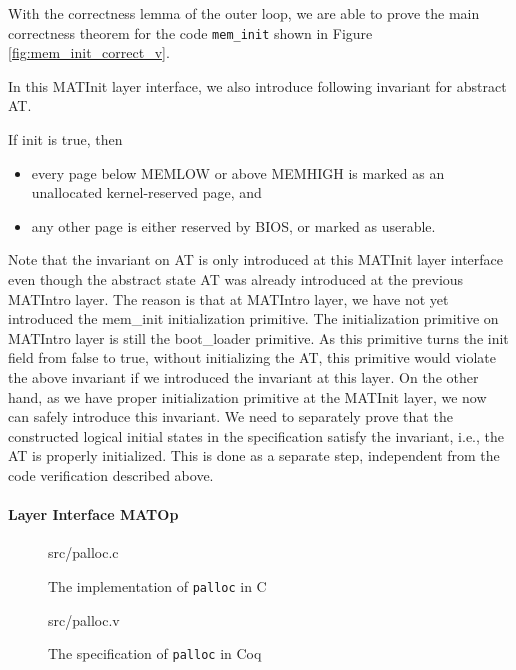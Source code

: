 With the correctness lemma of the outer loop, we are able to prove the main correctness theorem for
the code \texttt{mem\_init} shown in Figure \ref{fig:mem_init_correct_v}.

In this MATInit layer interface, we also introduce following invariant for abstract \textsf{AT}.

\begin{invariant}[valid AT] If \textsf{init} is \textsf{true}, then
\begin{itemize}
\item every page below \textsf{MEMLOW} or above \textsf{MEMHIGH} is marked as an unallocated kernel-reserved page, and
\item any other page is either reserved by BIOS, or marked as userable.
\end{itemize}
\end{invariant}

Note that the invariant on \textsf{AT} is only introduced at this MATInit layer interface even though the abstract
state \textsf{AT} was already introduced at the previous MATIntro layer. The reason is that at MATIntro layer, 
we have not yet introduced the \textsf{mem\_init} initialization primitive. The initialization primitive on MATIntro layer
is still the \textsf{boot\_loader} primitive. As this primitive turns the \textsf{init} field from \textsf{false} to \textsf{true},
without initializing the \textsf{AT}, this primitive would violate the above invariant if we introduced the invariant at this layer.
On the other hand, as we have proper initialization primitive at the MATInit layer, we now can safely introduce this invariant.
We need to separately prove that the constructed logical initial states in the specification satisfy the invariant, i.e., the \textsf{AT}
is properly initialized. This is done as a separate step, independent from the code verification described above.


\paragraph{Layer Interface MATOp}

\begin{figure}
	 {src/palloc.c}
	\caption{The implementation of \texttt{palloc} in C}
	\label{fig:palloc_c}
\end{figure}

\begin{figure}
	 {src/palloc.v}
	\caption{The specification of \texttt{palloc} in Coq}
	\label{fig:palloc_v}
\end{figure}

